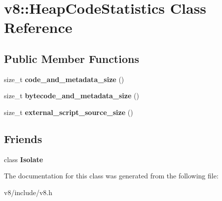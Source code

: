 \hypertarget{classv8_1_1HeapCodeStatistics}{}\section{v8\+:\+:Heap\+Code\+Statistics Class Reference}
\label{classv8_1_1HeapCodeStatistics}
\subsection*{Public Member Functions}
\begin{DoxyCompactItemize}
\item 
\mbox{\label{classv8_1_1HeapCodeStatistics_a4d59ec2ccb0bb2a09f75bea9f773b030}} 
size\+\_\+t {\bfseries code\+\_\+and\+\_\+metadata\+\_\+size} ()
\item 
\mbox{\label{classv8_1_1HeapCodeStatistics_a2d00093607204aa5369d569f955da044}} 
size\+\_\+t {\bfseries bytecode\+\_\+and\+\_\+metadata\+\_\+size} ()
\item 
\mbox{\label{classv8_1_1HeapCodeStatistics_a19dfa71073566072e5aeebfaa6513b43}} 
size\+\_\+t {\bfseries external\+\_\+script\+\_\+source\+\_\+size} ()
\end{DoxyCompactItemize}
\subsection*{Friends}
\begin{DoxyCompactItemize}
\item 
\mbox{\label{classv8_1_1HeapCodeStatistics_aba4f0964bdacf2bbf62cf876e5d28d0a}} 
class {\bfseries Isolate}
\end{DoxyCompactItemize}


The documentation for this class was generated from the following file\+:\begin{DoxyCompactItemize}
\item 
v8/include/v8.\+h\end{DoxyCompactItemize}
